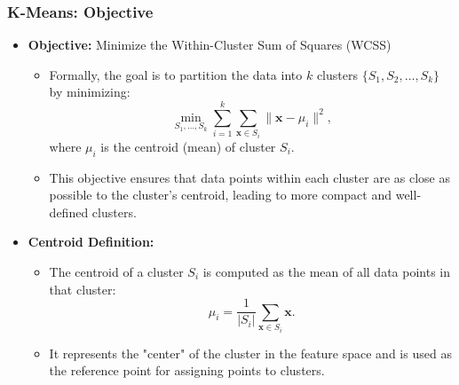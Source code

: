 \documentclass[aspectratio=169]{beamer}
\begin{document}
    \begin{frame}
        \frametitle{K-Means: Objective}
        \begin{itemize}
            \item \textbf{Objective:} Minimize the Within-Cluster Sum of Squares (WCSS)
                \begin{itemize}
                    \item Formally, the goal is to partition the data into \(k\) clusters \(\{S_1, S_2, \ldots, S_k\}\) by minimizing:
                    \[
                    \min_{S_1,\dots,S_k} \sum_{i=1}^{k} \sum_{\mathbf{x} \in S_i} \|\mathbf{x} - \mu_i\|^2,
                    \]
                    where \(\mu_i\) is the centroid (mean) of cluster \(S_i\).
                    \item This objective ensures that data points within each cluster are as close as possible to the cluster's centroid, leading to more compact and well-defined clusters.
                \end{itemize}
            \item \textbf{Centroid Definition:}
                \begin{itemize}
                    \item The centroid of a cluster \(S_i\) is computed as the mean of all data points in that cluster:
                    \[
                    \mu_i = \frac{1}{|S_i|} \sum_{\mathbf{x} \in S_i} \mathbf{x}.
                    \]
                    \item It represents the "center" of the cluster in the feature space and is used as the reference point for assigning points to clusters.
                \end{itemize}
        \end{itemize}
        \end{frame}
\end{document}
